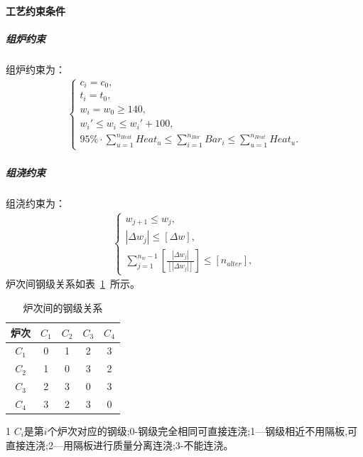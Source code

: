 \documentclass{whutmod}
\begin{document}
\paragraph{工艺约束条件}
\subparagraph{组炉约束}
组炉约束为：
\begin{gather}
\left\{\begin{matrix}
c_i=c_0,
\\ t_i=t_0,
\\ w_i=w_0\geq 140,
\\ w_i'\leq w_i\leq w_i'+100,
\\ 95\% \cdot \sum_{u=1}^{n_{Heat}}Heat_u\leq\sum_{i=1}^{n_{Bar}}Bar_i\leq\sum_{u=1}^{n_{Heat}}Heat_u.
\end{matrix}\right.
\end{gather}

\subparagraph{组浇约束}
组浇约束为：
\begin{gather}
\left\{\begin{matrix}
w_{j+1}\leq w_{j},
\\ |\Delta w_j|\leq [\Delta w],
\\\sum_{j=1}^{n_{w}-1}[\frac{|\Delta w_j|}{[|\Delta w_j|]}]\leq [n_{alter}],
\end{matrix}\right.
\end{gather}
炉次间钢级关系如表~\ref{biao1}~所示。
\begin{table}[H]
\centering		
\caption{炉次间的钢级关系}\label{biao1}
\begin{threeparttable}
\begin{tabular}{ccccc}
\toprule[2pt]
\multicolumn{1}{m{2cm}}{\centering 炉次\tnote{1}}
& \multicolumn{1}{m{2cm}}{\centering $C_1$}
& \multicolumn{1}{m{2cm}}{\centering $C_2$}
& \multicolumn{1}{m{2cm}}{\centering $C_3$}
& \multicolumn{1}{m{2cm}}{\centering $C_4$}
\\
\midrule[1pt]
$C_1$ &0&1&2&3\\ 
$C_2$ &1&0&3&2\\ 
$C_3$ &2&3&0&3\\ 
$C_4$ &3&2&3&0\\ 
\bottomrule[2pt]	
\end{tabular}
\begin{tablenotes}
\footnotesize
\item[1]$C_i$是第$i$个炉次对应的钢级;0-钢级完全相同可直接连浇;1—钢级相近不用隔板,可直接连浇;2—用隔板进行质量分离连浇;3-不能连浇。
\end{tablenotes}
\end{threeparttable}
\end{table}
\end{document}
